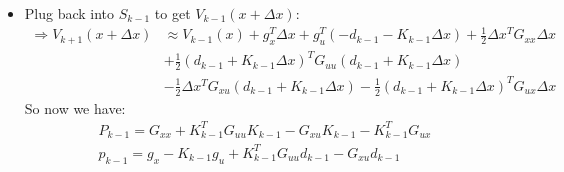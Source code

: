 \documentclass[11pt]{article}
\begin{document}
\begin{itemize}
    \item Plug back into $S_{k-1}$ to get $V_{k-1}(x+\Delta x)$:
    \begin{align*}
        \Rightarrow V_{k+1}(x + \Delta x) &\approx V_{k-1}(x) + g_x^T\Delta x + g_u^T(-d_{k-1} - K_{k-1}\Delta x) + \frac{1}{2}\Delta x^T G_{xx}\Delta x 
        \\ 
        &+\frac{1}{2}(d_{k-1} + K_{k-1}\Delta x)^T G_{uu}(d_{k-1} + K_{k-1}\Delta x) 
        \\
        & - \frac{1}{2}\Delta x^T G_{xu}(d_{k-1} + K_{k-1}\Delta x) - \frac{1}{2}(d_{k-1} + K_{k-1}\Delta x)^TG_{ux}\Delta x
    \end{align*}
    So now we have:
    \begin{align*}
        \boxed{P_{k-1} = G_{xx} + K_{k-1}^TG_{uu}K_{k-1} - G_{xu}K_{k-1} - K_{k-1}^TG_{ux}}
        \\
        \boxed{p_{k-1} = g_x - K_{k-1}g_u + K_{k-1}^TG_{uu}d_{k-1} - G_{xu}d_{k-1}}
    \end{align*}
\end{itemize}
\end{document}
